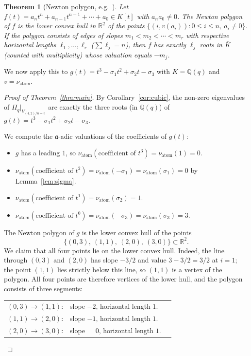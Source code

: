 \documentclass[11pt]{article}
\theoremstyle{plain}
\newtheorem{theorem}{Theorem}
\theoremstyle{definition}
\theoremstyle{remark}
\newcommand{\Q}{\mathbb{Q}}
\newcommand{\Pibs}{\Pi_q}
\newcommand{\val}{\nu_{\mathrm{atom}}}
\newcommand{\atom}{\mathfrak{a}}
\begin{document}
\begin{theorem}[Newton polygon, e.g.\ {\cite[Ch.~II,~Prop.~6.3]{Neukirch}}]
\label{thm:newton}
Let $f(t) = a_n t^n + a_{n-1} t^{n-1} + \cdots + a_0 \in K[t]$ with $a_n a_0 \neq 0$.
The \emph{Newton polygon} of $f$ is the lower convex hull in $\mathbb{R}^2$ of the
points $\{(i, v(a_i)) : 0 \leq i \leq n,\ a_i \neq 0\}$.  If the polygon consists
of edges of slopes $m_1 < m_2 < \cdots < m_r$ with respective horizontal lengths
$\ell_1, \ldots, \ell_r$ ($\sum \ell_j = n$), then $f$ has exactly $\ell_j$ roots
in $\bar K$ (counted with multiplicity) whose valuation equals $-m_j$.
\end{theorem}

We now apply this to $g(t) = t^3 - \sigma_1 t^2 + \sigma_2 t - \sigma_3$ with
$K = \Q(q)$ and $v = \val$.

\begin{proof}[Proof of Theorem~\ref{thm:main}]
By Corollary~\ref{cor:cubic}, the non-zero eigenvalues of $\Pibs|_{V_{(4,2)/n=6}}$
are exactly the three roots (in $\overline{\Q(q)}$) of
$g(t) = t^3 - \sigma_1 t^2 + \sigma_2 t - \sigma_3$.

We compute the $\atom$-adic valuations of the coefficients of $g(t)$:
\begin{itemize}
\item $g$ has a leading $1$, so $\val(\text{coefficient of } t^3) = \val(1) = 0$.
\item $\val(\text{coefficient of } t^2) = \val(-\sigma_1) = \val(\sigma_1) = 0$ by
  Lemma~\ref{lem:sigma}.
\item $\val(\text{coefficient of } t^1) = \val(\sigma_2) = 1$.
\item $\val(\text{coefficient of } t^0) = \val(-\sigma_3) = \val(\sigma_3) = 3$.
\end{itemize}

The Newton polygon of $g$ is the lower convex hull of the points
\[ \big\{(0, 3),\ (1, 1),\ (2, 0),\ (3, 0)\big\} \subset \mathbb{R}^2. \]
We claim that all four points lie on the lower convex hull.  Indeed, the line
through $(0,3)$ and $(2,0)$ has slope $-3/2$ and value $3 - 3/2 = 3/2$ at $i=1$;
the point $(1,1)$ lies strictly below this line, so $(1,1)$ is a vertex of the
polygon.  All four points are therefore vertices of the lower hull, and the polygon
consists of three segments:
\begin{center}
\begin{tabular}{lll}
$(0,3) \to (1,1)$: & slope $-2$, \quad horizontal length $1$. \\
$(1,1) \to (2,0)$: & slope $-1$, \quad horizontal length $1$. \\
$(2,0) \to (3,0)$: & slope $\phantom{-}0$, \quad horizontal length $1$.
\end{tabular}
\end{center}


\end{proof}
\end{document}
